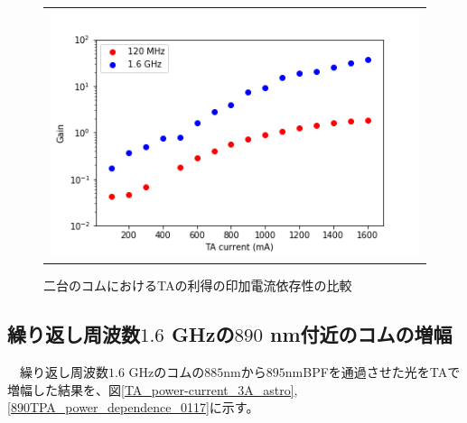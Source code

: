 \documentclass[uplatex, dvipdfmx, a4paper, report, papersize, 11pt]{jsbook}
\begin{document}
\begin{figure}[htpb]
\begin{tabular}{c}
      \begin{minipage}{0.50\hsize}
        \centering
          \includegraphics[keepaspectratio,  scale=0.35,  angle=0]
                          {figures/chapter4/TA_cuurent-gain_comparison.png}
                          \caption{二台のコムにおけるTAの利得の印加電流依存性の比較}
                          \label{TA_cuurent-gain_comparison}
      \end{minipage}
    \end{tabular}
\end{figure}
\subsection{繰り返し周波数$1.6$ GHzの$890$ nm付近のコムの増幅}
　繰り返し周波数$1.6$ GHzのコムの$885 \mathrm{nm}から 895 \mathrm{nm}$BPFを通過させた光をTAで増幅した結果を、図\ref{TA_power-current_3A_astro}, \ref{890TPA_power_dependence_0117}に示す。
\end{document}
